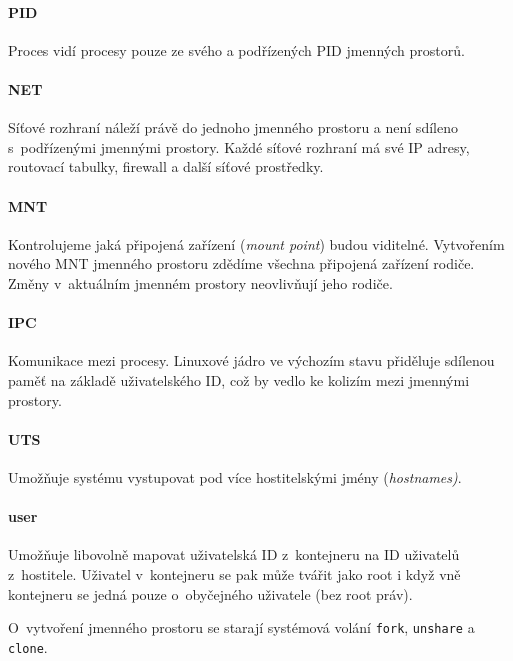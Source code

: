 \paragraph{PID}

Proces vidí procesy pouze ze svého a podřízených PID jmenných prostorů.

\paragraph{NET}

Síťové rozhraní náleží právě do jednoho jmenného prostoru a není sdíleno s~podřízenými jmennými prostory.
Každé síťové rozhraní má své IP adresy, routovací tabulky, firewall a další síťové prostředky. 

\paragraph{MNT}

Kontrolujeme jaká připojená zařízení (\textit{mount point}) budou viditelné.
Vytvořením nového MNT jmenného prostoru zdědíme všechna připojená zařízení rodiče.
Změny v~aktuálním jmenném prostory neovlivňují jeho rodiče.

\paragraph{IPC}

Komunikace mezi procesy.
Linuxové jádro ve výchozím stavu přiděluje sdílenou paměť na základě uživatelského ID, což by vedlo ke kolizím mezi jmennými prostory.

\paragraph{UTS}

Umožňuje systému vystupovat pod více hostitelskými jmény (\textit{hostnames)}.

\paragraph{user}

Umožňuje libovolně mapovat uživatelská ID z~kontejneru na ID uživatelů z~hostitele.
Uživatel v~kontejneru se pak může tvářit jako root i když vně kontejneru se jedná pouze o~obyčejného uživatele (bez root práv).


O~vytvoření jmenného prostoru se starají systémová volání \verb|fork|, \verb|unshare| a \verb|clone|.

